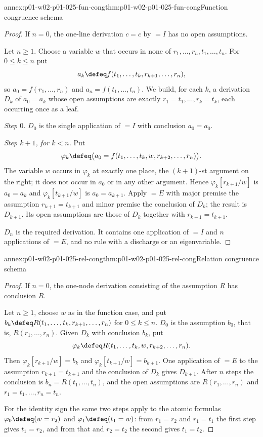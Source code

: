 \begin{annexitem}{annex:p01-w02-p01-025-fun-cong}{thm:p01-w02-p01-025-fun-cong}{Function congruence schema}
\begin{proof}
If \(n=0\), the one-line derivation \(c=c\) by \(=I\) has no open
assumptions.

Let \(n\geq 1\).  Choose a variable \(w\) that occurs in none of
\(r_1,\ldots,r_n,t_1,\ldots,t_n\).  For \(0\leq k\leq n\) put
\[
 a_k\defeq f(t_1,\ldots,t_k,r_{k+1},\ldots,r_n),
\]
so \(a_0=f(r_1,\ldots,r_n)\) and \(a_n=f(t_1,\ldots,t_n)\).  We build, for
each \(k\), a derivation \(D_k\) of \(a_0=a_k\) whose open assumptions are
exactly \(r_1=t_1,\ldots,r_k=t_k\), each occurring once as a leaf.

\emph{Step \(0\).}  \(D_0\) is the single application of \(=I\) with
conclusion \(a_0=a_0\).

\emph{Step \(k+1\), for \(k<n\).}  Put
\[
 \varphi_k\defeq
 \bigl(a_0=f(t_1,\ldots,t_k,w,r_{k+2},\ldots,r_n)\bigr).
\]
The variable \(w\) occurs in \(\varphi_k\) at exactly one place, the
\((k+1)\)-st argument on the right; it does not occur in \(a_0\) or in any
other argument.  Hence \(\varphi_k[r_{k+1}/w]\) is \(a_0=a_k\) and
\(\varphi_k[t_{k+1}/w]\) is \(a_0=a_{k+1}\).  Apply \(=E\) with major premise
the assumption \(r_{k+1}=t_{k+1}\) and minor premise the conclusion of
\(D_k\); the result is \(D_{k+1}\).  Its open assumptions are those of
\(D_k\) together with \(r_{k+1}=t_{k+1}\).

\(D_n\) is the required derivation.  It contains one application of \(=I\)
and \(n\) applications of \(=E\), and no rule with a discharge or an
eigenvariable.
\end{proof}
\end{annexitem}

\begin{annexitem}{annex:p01-w02-p01-025-rel-cong}{thm:p01-w02-p01-025-rel-cong}{Relation congruence schema}
\begin{proof}
If \(n=0\), the one-node derivation consisting of the assumption \(R\) has
conclusion \(R\).

Let \(n\geq 1\), choose \(w\) as in the function case, and put
\(b_k\defeq R(t_1,\ldots,t_k,r_{k+1},\ldots,r_n)\) for
\(0\leq k\leq n\).  \(D_0\) is the assumption \(b_0\), that is,
\(R(r_1,\ldots,r_n)\).
Given \(D_k\) with conclusion \(b_k\), put
\[
 \varphi_k\defeq R(t_1,\ldots,t_k,w,r_{k+2},\ldots,r_n).
\]
Then \(\varphi_k[r_{k+1}/w]=b_k\) and \(\varphi_k[t_{k+1}/w]=b_{k+1}\).  One
application of \(=E\) to the assumption \(r_{k+1}=t_{k+1}\) and the
conclusion of \(D_k\) gives \(D_{k+1}\).  After \(n\) steps the conclusion is
\(b_n=R(t_1,\ldots,t_n)\), and the open assumptions are
\(R(r_1,\ldots,r_n)\) and \(r_1=t_1,\ldots,r_n=t_n\).

For the identity sign the same two steps apply to the atomic formulas
\(\varphi_0\defeq(w=r_2)\) and \(\varphi_1\defeq(t_1=w)\): from
\(r_1=r_2\) and \(r_1=t_1\) the first step gives \(t_1=r_2\), and from that
and \(r_2=t_2\) the second gives \(t_1=t_2\).
\end{proof}
\end{annexitem}

